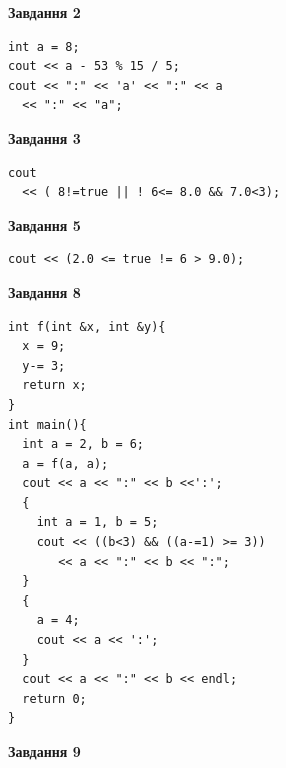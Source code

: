 \documentclass[12pt, ukrainian]{article}
\begin{document}
{\begin {large}
\begin{minipage}[t]{7.0cm}
\end{minipage}
\vline \hspace{1mm}
\begin{minipage}[t]{11.0cm}

\begin{center}
\textbf{Завдання 2}
\end{center}
\vspace{-8mm}

\begin{verbatim}
int a = 8;
cout << a - 53 % 15 / 5;
cout << ":" << 'a' << ":" << a 
  << ":" << "a";
\end{verbatim}



\begin{center}
\textbf{Завдання 3}
\end{center}
\vspace{-8mm}

\begin{verbatim}
cout 
  << ( 8!=true || ! 6<= 8.0 && 7.0<3);
\end{verbatim}



\begin{center}
\textbf{Завдання 5}
\end{center}
\vspace{-8mm}

\begin{verbatim}
cout << (2.0 <= true != 6 > 9.0);
\end{verbatim}



\begin{center}
\textbf{Завдання 8}
\end{center}
\vspace{-8mm}

\begin{verbatim}
int f(int &x, int &y){
  x = 9;
  y-= 3;
  return x;
}
int main(){
  int a = 2, b = 6;
  a = f(a, a);
  cout << a << ":" << b <<':';
  {
    int a = 1, b = 5;
    cout << ((b<3) && ((a-=1) >= 3))
       << a << ":" << b << ":";
  }
  {
    a = 4;
    cout << a << ':';
  }
  cout << a << ":" << b << endl;
  return 0;
}
\end{verbatim}

\end{minipage}


\begin{minipage}[t]{7.0cm}

\begin{center}
\textbf{Завдання 9}
\end{center}
\vspace{-8mm}


\end{minipage}
\end{large}}
\end{document}
